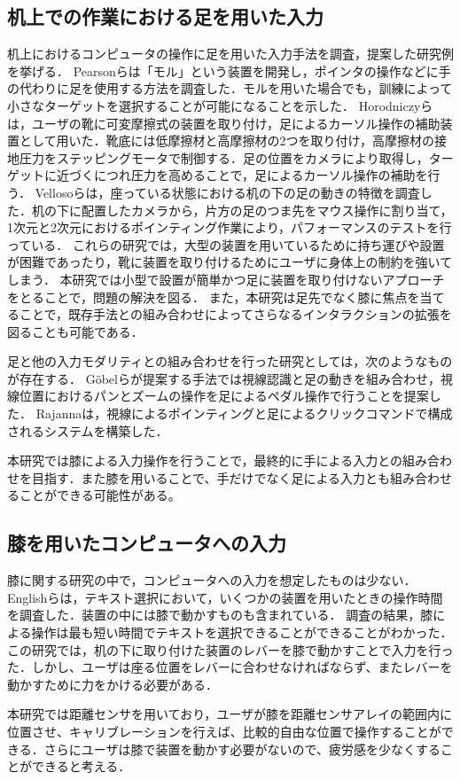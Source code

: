 \documentclass[submit, techrep]{ipsj}
\begin{document}
\subsection{机上での作業における足を用いた入力}
机上におけるコンピュータの操作に足を用いた入力手法を調査，提案した研究例を挙げる．
Pearsonら\cite{Pearson:1986:MMD:22627.22392, Pearson:1988:EEP:57167.57169}は「モル」という装置を開発し，ポインタの操作などに手の代わりに足を使用する方法を調査した．モルを用いた場合でも，訓練によって小さなターゲットを選択することが可能になることを示した．
Horodniczyら\cite{Horodniczy:2017:FHE:3025453.3025625}は，ユーザの靴に可変摩擦式の装置を取り付け，足によるカーソル操作の補助装置として用いた．靴底には低摩擦材と高摩擦材の2つを取り付け，高摩擦材の接地圧力をステッピングモータで制御する．足の位置をカメラにより取得し，ターゲットに近づくにつれ圧力を高めることで，足によるカーソル操作の補助を行う．
Vellosoら\cite{velloso:hal-01599657}は，座っている状態における机の下の足の動きの特徴を調査した．机の下に配置したカメラから，片方の足のつま先をマウス操作に割り当て，1次元と2次元におけるポインティング作業により，パフォーマンスのテストを行っている．
これらの研究では，大型の装置を用いているために持ち運びや設置が困難であったり，靴に装置を取り付けるためにユーザに身体上の制約を強いてしまう．
本研究では小型で設置が簡単かつ足に装置を取り付けないアプローチをとることで，問題の解決を図る．
また，本研究は足先でなく膝に焦点を当てることで，既存手法との組み合わせによってさらなるインタラクションの拡張を図ることも可能である．\par
足と他の入力モダリティとの組み合わせを行った研究としては，次のようなものが存在する．
G\"{o}belら\cite{Gobel:2013:GFI:2468356.2479610}が提案する手法では視線認識と足の動きを組み合わせ，視線位置におけるパンとズームの操作を足によるペダル操作で行うことを提案した．
Rajanna\cite{Rajanna:2016:GFI:2876456.2876462}は，視線によるポインティングと足によるクリックコマンドで構成されるシステムを構築した．\par
本研究では膝による入力操作を行うことで，最終的に手による入力との組み合わせを目指す．また膝を用いることで、手だけでなく足による入力とも組み合わせることができる可能性がある。

\subsection{膝を用いたコンピュータへの入力}
膝に関する研究の中で，コンピュータへの入力を想定したものは少ない．
Englishら\cite{1698228}は，テキスト選択において，いくつかの装置を用いたときの操作時間を調査した．装置の中には膝で動かすものも含まれている．
調査の結果，膝による操作は最も短い時間でテキストを選択できることができることがわかった．
この研究では，机の下に取り付けた装置のレバーを膝で動かすことで入力を行った．しかし、ユーザは座る位置をレバーに合わせなければならず、またレバーを動かすために力をかける必要がある．\par
本研究では距離センサを用いており，ユーザが膝を距離センサアレイの範囲内に位置させ、キャリブレーションを行えば、比較的自由な位置で操作することができる．さらにユーザは膝で装置を動かす必要がないので、疲労感を少なくすることができると考える．
\end{document}
